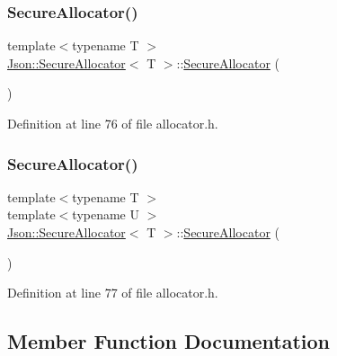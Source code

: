 \subsubsection{\texorpdfstring{Secure\+Allocator()}{SecureAllocator()}\hspace{0.1cm}{\footnotesize\ttfamily [1/2]}}
{\footnotesize\ttfamily template$<$typename T $>$ \\
\hyperlink{class_json_1_1_secure_allocator}{Json\+::\+Secure\+Allocator}$<$ T $>$\+::\hyperlink{class_json_1_1_secure_allocator}{Secure\+Allocator} (\begin{DoxyParamCaption}{ }\end{DoxyParamCaption})\hspace{0.3cm}{\ttfamily [inline]}}



Definition at line 76 of file allocator.\+h.

\hypertarget{class_json_1_1_secure_allocator_afefbe83997eb1da2089229771957e6bd}{}\label{class_json_1_1_secure_allocator_afefbe83997eb1da2089229771957e6bd} 
\subsubsection{\texorpdfstring{Secure\+Allocator()}{SecureAllocator()}\hspace{0.1cm}{\footnotesize\ttfamily [2/2]}}
{\footnotesize\ttfamily template$<$typename T $>$ \\
template$<$typename U $>$ \\
\hyperlink{class_json_1_1_secure_allocator}{Json\+::\+Secure\+Allocator}$<$ T $>$\+::\hyperlink{class_json_1_1_secure_allocator}{Secure\+Allocator} (\begin{DoxyParamCaption}\item[{const \hyperlink{class_json_1_1_secure_allocator}{Secure\+Allocator}$<$ U $>$ \&}]{ }\end{DoxyParamCaption})\hspace{0.3cm}{\ttfamily [inline]}}



Definition at line 77 of file allocator.\+h.



\subsection{Member Function Documentation}
\hypertarget{class_json_1_1_secure_allocator_a2f26b3dbf3cfffcc376844fb19733422}{}\label{class_json_1_1_secure_allocator_a2f26b3dbf3cfffcc376844fb19733422} 
